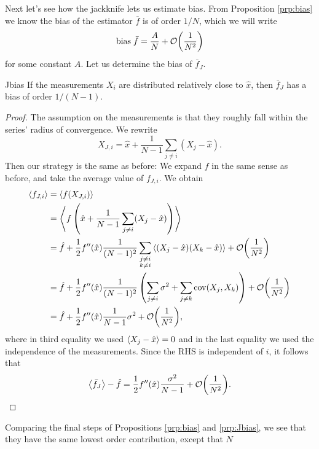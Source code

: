 Next let's see how the jackknife lets us estimate bias.
From Proposition \ref{prp:bias} we know the bias of the estimator $\bar{f}$ 
is of order $1/N$, which we will write
\begin{equation}\label{eq:bias}
  \text{bias}\;\bar{f}=\frac{A}{N}+\order{\frac{1}{N^2}}
\end{equation}
for some constant $A$. Let us determine the bias of $\bar{f}_J$.
\begin{proposition}{}{Jbias}
  If the measurements $X_i$ are distributed relatively close to $\hat{x}$, 
  then $\bar{f}_J$ has a bias of order $1/(N-1)$.
  \begin{proof}
    The assumption on the measurements is that they roughly fall within
    the series' radius of convergence. We rewrite
    $$
      X_{J,i}=\hat{x}+\frac{1}{N-1}\sum_{j\neq i}(X_j-\hat{x}).
    $$
    Then our strategy is the same as before: We expand $f$ in the same
    sense as before, and take the average value of $f_{J,i}$.
    We obtain
    \begin{equation*}
      \begin{aligned}
        \ev{f_{J,i}}&=\ev{f(X_{J,i})}\\
          &=\ev{f\left(\hat{x}
            +\frac{1}{N-1}\sum_{j\neq i}(X_j-\hat{x})\right)}\\
          &=\hat{f}+\frac{1}{2}f''(\hat{x})\frac{1}{(N-1)^2}
             \sum_{\substack{j\neq i\\k\neq i}}
              \ev{(X_j-\hat{x})(X_k-\hat{x})}
             +\order{\frac{1}{N^2}}\\
          &=\hat{f}+\frac{1}{2}f''(\hat{x})\frac{1}{(N-1)^2}\left(
             \sum_{j\neq i}\sigma^2+\sum_{j\neq k}\Cov(X_j,X_k)\right)
             +\order{\frac{1}{N^2}}\\
          &=\hat{f}+\frac{1}{2}f''(\hat{x})\frac{1}{N-1}\sigma^2
             +\order{\frac{1}{N^2}},
      \end{aligned}
    \end{equation*}
    where in third equality we used $\ev{X_j-\hat{x}}=0$ and in the
    last equality we used the independence of the measurements. Since
    the RHS is independent of $i$, it follows that
    $$
      \ev{\bar{f}_J}-\hat{f}=\frac{1}{2}f''(\hat{x})\frac{\sigma^2}{N-1}
       +\order{\frac{1}{N^2}}.
    $$
  \end{proof}
\end{proposition}
Comparing the final steps of Propositions \ref{prp:bias} and \ref{prp:Jbias},
we see that they have the same lowest order contribution, except that $N$
